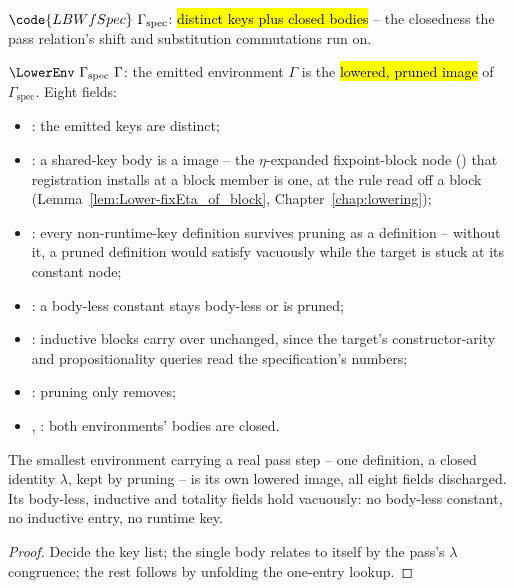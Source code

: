 \begin{definition}
\label{def:LBWfSpec}
\leanok
{}
 $\code{LBWfSpec}\ \Gamma_{\mathrm{spec}}$: \hl{distinct keys plus closed bodies} -- the closedness the pass relation's shift and substitution commutations run on.
\end{definition}

\begin{definition}
\label{def:LowerEnv}
\leanok
{}
 $\LowerEnv\ \Gamma_{\mathrm{spec}}\ \Gamma$: the emitted \lbox{} environment $\Gamma$ is the \hl{lowered, pruned image} of $\Gamma_{\mathrm{spec}}$. Eight fields:
\begin{itemize}
\item {}: the emitted keys are distinct;
\item {}: a shared-key body is a \Lower{} image -- the $\eta$-expanded fixpoint-block node () that registration installs at a block member is one, at the  rule read off a block (Lemma~\ref{lem:Lower-fixEta_of_block}, Chapter~\ref{chap:lowering});
\item {}: every non-runtime-key definition survives pruning as a definition -- without it, a pruned definition would satisfy  vacuously while the target is stuck at its constant node;
\item {}: a body-less constant stays body-less or is pruned;
\item {}: inductive blocks carry over unchanged, since the target's constructor-arity and propositionality queries read the specification's numbers;
\item {}: pruning only removes;
\item {}, : both environments' bodies are closed.
\end{itemize}
\end{definition}

\begin{lemma}
\label{lem:lowerEnv_idEnv}
\leanok
{}
 The smallest environment carrying a real pass step -- one definition, a closed identity $\lambda$, kept by pruning -- is its own lowered image, all eight fields discharged.
 Its body-less, inductive and totality fields hold vacuously: no body-less constant, no inductive entry, no runtime key.
\end{lemma}
\begin{proof}
\leanok
{}
 Decide the key list; the single body relates to itself by the pass's $\lambda$ congruence; the rest follows by unfolding the one-entry lookup.
\end{proof}

